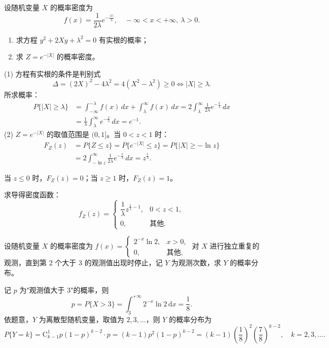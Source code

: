 \documentclass[lang=cn,11pt]{elegantbook}
\begin{document}
\begin{exercise}[拉普拉斯分布变换] 
设随机变量 $X$ 的概率密度为
\[
f(x)=\frac{1}{2\lambda}e^{-\frac{|x|}{\lambda}},\quad -\infty<x<+\infty,\ \lambda>0.
\]
\begin{enumerate}
    \item[(1)] 求方程 $y^2+2Xy+\lambda^2=0$ 有实根的概率；
    \item[(2)] 求 $Z=e^{-|X|}$ 的概率密度。
\end{enumerate}
\end{exercise}
\begin{solution}
(1) 方程有实根的条件是判别式
\[
\Delta = (2X)^2 - 4\lambda^2 = 4(X^2-\lambda^2) \geqslant 0 \Leftrightarrow |X|\geqslant\lambda.
\]
所求概率：
\[
\begin{aligned}
P\{|X|\geqslant\lambda\} &= \int_{-\infty}^{-\lambda} f(x)\,dx + \int_{\lambda}^{\infty} f(x)\,dx = 2\int_{\lambda}^{\infty} \frac{1}{2\lambda}e^{-\frac{x}{\lambda}}\,dx \\
&= \frac{1}{\lambda}\int_{\lambda}^{\infty} e^{-\frac{x}{\lambda}}\,dx = e^{-1}.
\end{aligned}
\]
(2) $Z=e^{-|X|}$ 的取值范围是 $(0,1]$。当 $0<z<1$ 时：
\[
\begin{aligned}
F_Z(z) &= P\{Z\leqslant z\} = P\{e^{-|X|}\leqslant z\} = P\{|X|\geqslant -\ln z\} \\
&= 2\int_{-\ln z}^{\infty} \frac{1}{2\lambda}e^{-\frac{x}{\lambda}}\,dx = z^{\frac{1}{\lambda}}.
\end{aligned}
\]

当 $z\leqslant0$ 时，$F_Z(z)=0$；当 $z\geqslant1$ 时，$F_Z(z)=1$。

求导得密度函数：
\[
f_Z(z) =
\begin{cases}
\dfrac{1}{\lambda}z^{\frac{1}{\lambda}-1}, & 0<z<1, \\[6pt]
0, & \text{其他}.
\end{cases}
\]
\end{solution}



\begin{exercise}\label{exer:2-14}
设随机变量 $X$ 的概率密度为 $f(x) = \begin{cases} 2^{-x}\ln 2, & x > 0, \\ 0, & \text{其他}, \end{cases}$ 对 $X$ 进行独立重复的观测，直到第 2 个大于 3 的观测值出现时停止，记 $Y$ 为观测次数，求 $Y$ 的概率分布。
\end{exercise}

\begin{solution}
记 $p$ 为"观测值大于 3"的概率，则
\[
p = P\{X > 3\} = \int_3^{+\infty} 2^{-x}\ln 2\,\mathrm{d}x = \frac{1}{8}.
\]
依题意，$Y$ 为离散型随机变量，取值为 $2,3,\dots$，则 $Y$ 的概率分布为
\[
P\{Y=k\} = \mathrm{C}_{k-1}^1 p(1-p)^{k-2} \cdot p = (k-1)p^2(1-p)^{k-2} = (k-1)\left(\frac{1}{8}\right)^2\left(\frac{7}{8}\right)^{k-2},\quad k=2,3,\dots.
\]
\end{solution}
\end{document}
